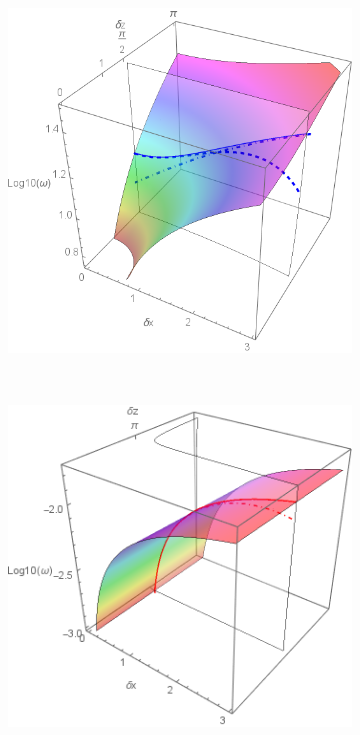 \documentclass[a4paper,11pt]{article}
\begin{document}
\begin{figure}[!h]
	\centering		
	\begin{subfigure}{0.45\linewidth}
		\includegraphics[width=1\linewidth]
		{FIGURES/Fig_App3_Real_Acous.png}
		\caption{}
	\end{subfigure}
	~
	\centering
	\begin{subfigure}{0.45\linewidth}
		\includegraphics[width=1\linewidth]
		{FIGURES/Fig_App3_Real_Grav_v2.png}
		\caption{}
	\end{subfigure}
	

\end{figure}
\end{document}
